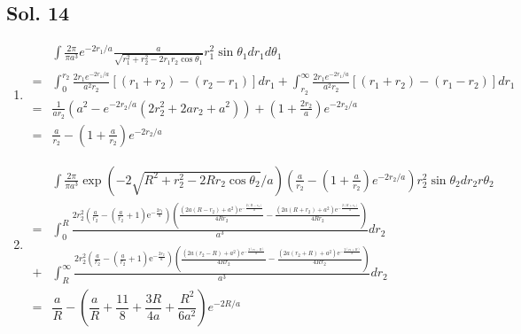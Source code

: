 \subsection*{Sol. 14}
\begin{enumerate}
    \item 
    \begin{align*}
        & \int \frac{2\pi}{\pi a^3}
        e^{-2r_1/a}
        \frac{a}{\sqrt{r_1^2+r_2^2-2r_1r_2\cos\theta_1}}
        r_1^2\sin\theta_1 dr_1d\theta_1\\
        =&
        \int_0^{r_2}\frac{2r_1e^{-2r_1/a}}{a^2r_2}
        \left[
        (r_1+r_2)-(r_2-r_1)
        \right]dr_1
        +
        \int_{r_2}^\infty
        \frac{2r_1e^{-2r_1/a}}{a^2r_2}
        \left[
        (r_1+r_2)-(r_1-r_2)
        \right]dr_1\\
        =&
        \frac{1}{ar_2}
        \left(a^2-
        e^{-2r_2/a}
        (2r_2^2+2ar_2+a^2)\right)
        +
        (1+\frac{2r_2}{a})e^{-2r_2/a}\\
        =&
        \frac{a}{r_2}
        -\left(
        1 + \frac{a}{r_2}
        \right)e^{-2r_2/a}
    \end{align*}
    \item 
    \begin{align*}
        &\int 
        \frac{2\pi}{\pi a^3}
        \exp\left(
        -2\sqrt{R^2+r_2^2-2Rr_2\cos\theta_2}/a
        \right)
        \left(
        \frac{a}{r_2}
        -\left(
        1 + \frac{a}{r_2}
        \right)e^{-2r_2/a}
        \right)
        r_2^2
        \sin\theta_2 dr_2r\theta_2\\
        =&
        \int_0^R
       \frac{2r_{2}^{2} \left(\frac{a}{r_{2}} - \left(\frac{a}{r_{2}} + 1\right) \mathrm{e}^{-\frac{2r_{2}}{a}}\right) \left(\frac{\left(2a (R-r_2) + a^{2}\right) \mathrm{e}^{-\frac{2(R-r_2)}{a}}}{4Rr_{2}} - \frac{\left(2a (R+r_2) + a^{2}\right) \mathrm{e}^{-\frac{2 (R+r_2)}{a}}}{4Rr_{2}}\right)}{a^{3}}
        dr_2
        \\
        +&
        \int_R^\infty
        \frac{2r_{2}^{2} \left(\frac{a}{r_{2}} - \left(\frac{a}{r_{2}} + 1\right) \mathrm{e}^{-\frac{2r_{2}}{a}}\right) \left(\frac{\left(2a (r_2-R) + a^{2}\right) \mathrm{e}^{-\frac{2 (r_2-R)}{a}}}{4Rr_{2}} - \frac{\left(2a (r_2+R)+ a^{2}\right) \mathrm{e}^{-\frac{2 (r_2+R)}{a}}}{4Rr_{2}}\right)}{a^{3}}
        dr_2\\
        =&
        \dfrac{a}{R}-\left(\dfrac{a}{R}+\dfrac{11}{8}+\dfrac{3R}{4a}+\dfrac{R^{2}}{6a^{2}}\right)e^{-2R/a}
    \end{align*}
\end{enumerate}

